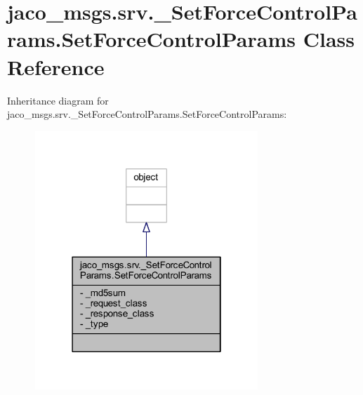 \hypertarget{classjaco__msgs_1_1srv_1_1__SetForceControlParams_1_1SetForceControlParams}{}\section{jaco\+\_\+msgs.\+srv.\+\_\+\+Set\+Force\+Control\+Params.\+Set\+Force\+Control\+Params Class Reference}
\label{classjaco__msgs_1_1srv_1_1__SetForceControlParams_1_1SetForceControlParams}


Inheritance diagram for jaco\+\_\+msgs.\+srv.\+\_\+\+Set\+Force\+Control\+Params.\+Set\+Force\+Control\+Params\+:
\nopagebreak
\begin{figure}[H]
\begin{center}
\leavevmode
\includegraphics[width=238pt]{dc/d76/classjaco__msgs_1_1srv_1_1__SetForceControlParams_1_1SetForceControlParams__inherit__graph}
\end{center}
\end{figure}


